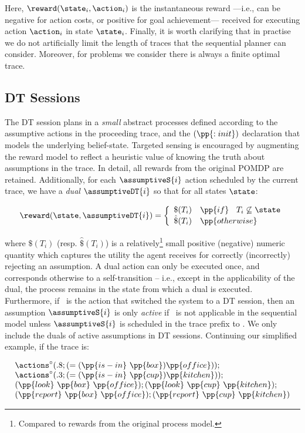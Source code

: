 \noindent  Here,  $\reward(\state_i, \action_i)$ is the instantaneous
reward ---i.e., can be negative for action costs, or positive for goal
achievement--- received for executing action $\action_i$ in state
$\state_i$. Finally, it is worth clarifying that in practise we do not
artificially limit the length of traces that the sequential planner
can consider. Moreover, for problems we consider there is always a
finite optimal trace.


\subsection{DT Sessions}

The DT session plans in a {\em small} abstract processes defined
according to the assumptive actions in the proceeding trace, and the
$(\pp{:init})$ declaration that models the underlying
belief-state. Targeted sensing is encouraged by augmenting the reward
model to reflect a heuristic value of knowing the truth about
assumptions in the trace. In detail, all rewards from the original
POMDP are retained. Additionally, for each $\assumptiveS{i}$ action
scheduled by the current trace, we have a {\em dual}
$\assumptiveDT{i}$ so that for all states $\state$:

\small
\[
\reward(\state, \assumptiveDT{i}) = \bigg\{ \begin{array}{ll}
\$(T_i) & \pp{if}~\;\;T_i \not\subseteq \state \\
\hat\$(T_i) & \pp{otherwise} \\
\end{array}
\]
\normalsize

\noindent where $\$(T_i)$ (resp. $\hat\$(T_i)$) is a 
relatively\footnote{Compared to rewards from the original process
model.} small positive (negative) numeric quantity which captures the
utility the agent receives for correctly (incorrectly) rejecting an
assumption. A dual action can only be executed once, and corresponds
otherwise to a self-transition -- i.e., except in the applicability of
the dual, the process remains in the state from which a dual is
executed.
Furthermore, if \switchAction\ is the action that switched the system
to a DT session, then an assumption $\assumptiveS{i}$ is only {\em
active} if
\switchAction\ is not applicable in the sequential model unless
$\assumptiveS{i}$ is scheduled in the trace prefix
to \switchAction. We only include the duals of active assumptions in
DT sessions. Continuing our simplified example, if the trace is:

\small
\[
\begin{array}{l}
\actions^{\circ}(.8;(=(\pp{is-in}~\pp{box})\pp{office}));\\
\actions^{\circ}(.3;(=(\pp{is-in}~\pp{cup})\pp{kitchen}));\\
(\pp{look}~\pp{box}~\pp{office});
(\pp{look}~\pp{cup}~\pp{kitchen});\\
(\pp{report}~\pp{box}~\pp{office}); 
(\pp{report}~\pp{cup}~\pp{kitchen})
\end{array}
\]
\normalsize

